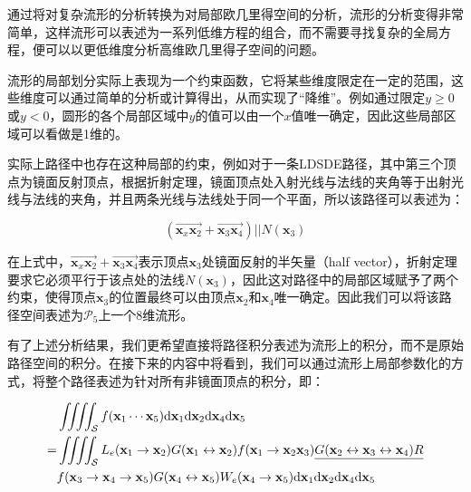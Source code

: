 通过将对复杂流形的分析转换为对局部欧几里得空间的分析，流形的分析变得非常简单，这样流形可以表述为一系列低维方程的组合，而不需要寻找复杂的全局方程，便可以以更低维度分析高维欧几里得子空间的问题。

流形的局部划分实际上表现为一个约束函数，它将某些维度限定在一定的范围，这些维度可以通过简单的分析或计算得出，从而实现了“降维”。例如通过限定$y\geq 0$或$y<0$，圆形的各个局部区域中$y$的值可以由一个$x$值唯一确定，因此这些局部区域可以看做是1维的。

实际上路径中也存在这种局部的约束，例如对于一条LDSDE路径，其中第三个顶点为镜面反射顶点，根据折射定理，镜面顶点处入射光线与法线的夹角等于出射光线与法线的夹角，并且两条光线与法线处于同一个平面，所以该路径可以表述为：

\begin{equation}
	(\overrightarrow {\mathbf{x}_x\mathbf{x}_2}+\overrightarrow{\mathbf{x}_3\mathbf{x}_4})||N(\mathbf{x}_3)
\end{equation}

\noindent 在上式中，$\overrightarrow {\mathbf{x}_x\mathbf{x}_2}+\overrightarrow{\mathbf{x}_3\mathbf{x}_4}$表示顶点$\mathbf{x}_3$处镜面反射的半矢量（half vector），折射定理要求它必须平行于该点处的法线$N(\mathbf{x}_3)$，因此这对路径中的局部区域赋予了两个约束，使得顶点$\mathbf{x}_3$的位置最终可以由顶点$\mathbf{x}_2$和$\mathbf{x}_4$唯一确定。因此我们可以将该路径空间表述为$\mathcal{P}_5$上一个8维流形。

有了上述分析结果，我们更希望直接将路径积分表述为流形上的积分，而不是原始路径空间的积分。在接下来的内容中将看到，我们可以通过流形上局部参数化的方式，将整个路径表述为针对所有非镜面顶点的积分，即：

\begin{equation}\label{e:mlt-integral-on-manifold}
\begin{aligned}
	&\iiiint_{\mathcal{S}}f(\mathbf{x}_1\cdots\mathbf{x}_5){\rm d}\mathbf{x}_1{\rm d}\mathbf{x}_2{\rm d}\mathbf{x}_4{\rm d}\mathbf{x}_5\\
	=&\iiiint_{\mathcal{S}}L_e(\mathbf{x}_1\to\mathbf{x}_2)G(\mathbf{x}_1\leftrightarrow\mathbf{x}_2)f(\mathbf{x}_1\to\mathbf{x}_2\mathbf{x}_3)\underline{G(\mathbf{x}_2\leftrightarrow\mathbf{x}_3\leftrightarrow\mathbf{x}_4)R}\\
	&f(\mathbf{x}_3\to\mathbf{x}_4\to\mathbf{x}_5)G(\mathbf{x}_4\leftrightarrow\mathbf{x}_5)W_e(\mathbf{x}_4\to\mathbf{x}_5){\rm d}\mathbf{x}_1{\rm d}\mathbf{x}_2{\rm d}\mathbf{x}_4{\rm d}\mathbf{x}_5
\end{aligned}
\end{equation}

